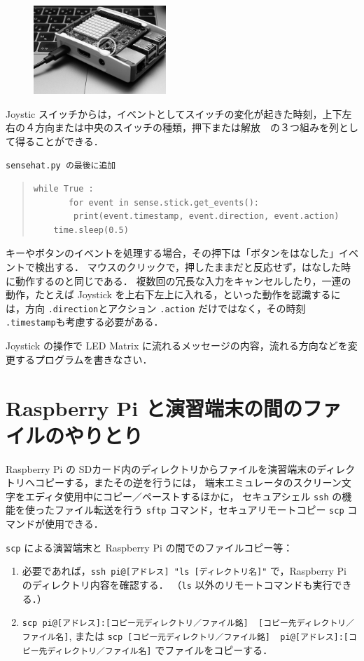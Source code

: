 \documentclass[11pt,a4,epsf]{article}
\begin{document}
\begin{figure}
\centering
\includegraphics[width=5cm]{joystick.jpg}
\end{figure}

Joystic スイッチからは，イベントとしてスイッチの変化が起きた時刻，上下左右の４方向または中央のスイッチの種類，押下または解放　の３つ組みを列として得ることができる．
\begin{itembox}[l]{\tt sensehat.py の最後に追加}
\begin{quote}
\small
\begin{verbatim}
while True :
       for event in sense.stick.get_events():
        print(event.timestamp, event.direction, event.action)
    time.sleep(0.5)
\end{verbatim}
\end{quote}
\end{itembox}
キーやボタンのイベントを処理する場合，その押下は「ボタンをはなした」イベントで検出する．
マウスのクリックで，押したままだと反応せず，はなした時に動作するのと同じである．
複数回の冗長な入力をキャンセルしたり，一連の動作，たとえば Joystick を上右下左上に入れる，といった動作を認識するには，方向 \verb+.direction+とアクション \verb+.action+ だけではなく，その時刻 \verb+.timestamp+も考慮する必要がある．

\begin{excercise}
Joystick の操作で LED Matrix に流れるメッセージの内容，流れる方向などを変更するプログラムを書きなさい．
\end{excercise}


\section{Raspberry Pi と演習端末の間のファイルのやりとり}

Raspberry Pi の SDカード内のディレクトリからファイルを演習端末のディレクトリへコピーする，またその逆を行うには，
端末エミュレータのスクリーン文字をエディタ使用中にコピー／ペーストするほかに，
セキュアシェル \verb+ssh+ の機能を使ったファイル転送を行う \verb+sftp+ コマンド，セキュアリモートコピー \verb+scp+ コマンドが使用できる．

\verb+scp+ による演習端末と Raspberry Pi の間でのファイルコピー等：
\begin{enumerate}
\item
必要であれば，\verb+ssh pi@[アドレス] "ls [ディレクトリ名]"+ で，Raspberry Pi のディレクトリ内容を確認する．
（\verb+ls+ 以外のリモートコマンドも実行できる．）
\item
\verb+scp pi@[アドレス]:[コピー元ディレクトリ／ファイル銘]  [コピー先ディレクトリ／ファイル名]+, または
\verb+scp [コピー元ディレクトリ／ファイル銘]  pi@[アドレス]:[コピー先ディレクトリ／ファイル名]+ でファイルをコピーする．
\end{enumerate}
\end{document}
